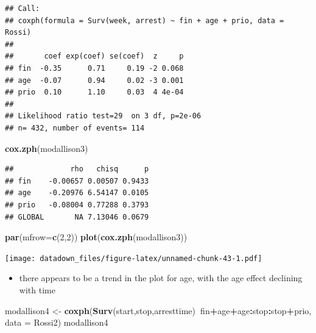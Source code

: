 \documentclass[]{book}
\newenvironment{Shaded}{\begin{snugshade}}{\end{snugshade}}
\newcommand{\DataTypeTok}[1]{\textcolor[rgb]{0.13,0.29,0.53}{#1}}
\newcommand{\DecValTok}[1]{\textcolor[rgb]{0.00,0.00,0.81}{#1}}
\newcommand{\KeywordTok}[1]{\textcolor[rgb]{0.13,0.29,0.53}{\textbf{#1}}}
\newcommand{\NormalTok}[1]{#1}
\newcommand{\OperatorTok}[1]{\textcolor[rgb]{0.81,0.36,0.00}{\textbf{#1}}}
\newcommand{\StringTok}[1]{\textcolor[rgb]{0.31,0.60,0.02}{#1}}
\providecommand{\tightlist}{%
  \setlength{\itemsep}{0pt}\setlength{\parskip}{0pt}}
\begin{document}
\begin{verbatim}
## Call:
## coxph(formula = Surv(week, arrest) ~ fin + age + prio, data = Rossi)
## 
##       coef exp(coef) se(coef)  z     p
## fin  -0.35      0.71     0.19 -2 0.068
## age  -0.07      0.94     0.02 -3 0.001
## prio  0.10      1.10     0.03  4 4e-04
## 
## Likelihood ratio test=29  on 3 df, p=2e-06
## n= 432, number of events= 114
\end{verbatim}

\begin{Shaded}
\begin{Highlighting}[]
\KeywordTok{cox.zph}\NormalTok{(modallison3)}
\end{Highlighting}
\end{Shaded}

\begin{verbatim}
##             rho   chisq      p
## fin    -0.00657 0.00507 0.9433
## age    -0.20976 6.54147 0.0105
## prio   -0.08004 0.77288 0.3793
## GLOBAL       NA 7.13046 0.0679
\end{verbatim}

\begin{Shaded}
\begin{Highlighting}[]
\KeywordTok{par}\NormalTok{(}\DataTypeTok{mfrow=}\KeywordTok{c}\NormalTok{(}\DecValTok{2}\NormalTok{,}\DecValTok{2}\NormalTok{))}
\KeywordTok{plot}\NormalTok{(}\KeywordTok{cox.zph}\NormalTok{(modallison3))}
\end{Highlighting}
\end{Shaded}

\texttt{[image: datadown\_files/figure-latex/unnamed-chunk-43-1.pdf]}

\begin{itemize}
\tightlist
\item
  there appears to be a trend in the plot for age, with the age effect declining with time
\end{itemize}

\begin{Shaded}
\begin{Highlighting}[]
\NormalTok{modallison4 <-}\StringTok{ }\KeywordTok{coxph}\NormalTok{(}\KeywordTok{Surv}\NormalTok{(start,stop,arresttime)}\OperatorTok{~}\NormalTok{fin}\OperatorTok{+}\NormalTok{age}\OperatorTok{+}\NormalTok{age}\OperatorTok{:}\NormalTok{stop}\OperatorTok{:}\NormalTok{stop}\OperatorTok{+}\NormalTok{prio, }\DataTypeTok{data =}\NormalTok{ Rossi2)}
\NormalTok{modallison4}
\end{Highlighting}
\end{Shaded}
\end{document}
